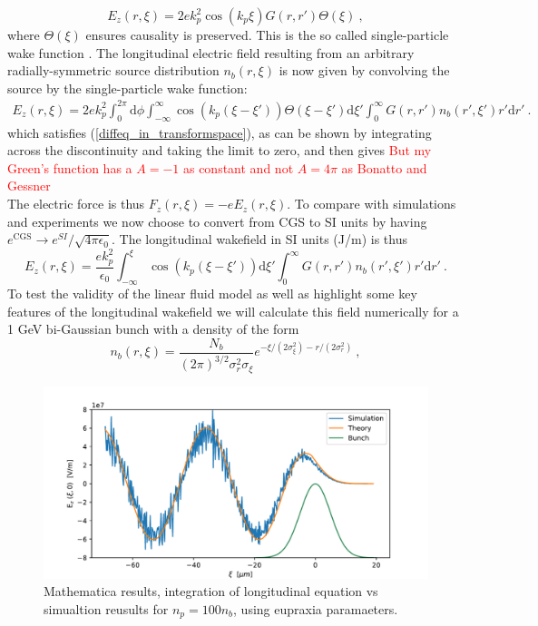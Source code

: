 \documentclass[%
onecolumn, notitlepage,
 amsmath,amssymb,
 aps,
]{article}
\begin{document}
\begin{equation}
E_z(r,\xi)=2ek_p^2\cos(k_p\xi)G\left(r,r'\right)\Theta(\xi)~,
\label{singe-particle-wake}
\end{equation}
where $\Theta(\xi)$ ensures causality is preserved. This is the so called single-particle wake function \cite{Katsouleas1987}. The longitudinal electric field resulting from an arbitrary radially-symmetric source distribution $n_b(r,\xi)$ is now given by convolving the source by the single-particle wake function:
\begin{align}
E_z(r,\xi)=2ek_p^2\int_0^{2\pi}\mathrm{d}\phi  \int_{-\infty}^{\infty} \cos(k_p(\xi-\xi'))\Theta(\xi-\xi')\mathrm{d}\xi' \int_{0}^{\infty}G\left(r,r'\right) n_b(r',\xi')r'\mathrm{d}r'~.
\end{align}
which satisfies (\ref{diffeq_in_transformspace}), as can be shown by integrating across the discontinuity and taking the limit to zero, and then gives
\textcolor{red}{But my Green's function has a $A=-1$ as constant and not $A=4\pi$ as Bonatto and Gessner}\\The electric force is thus $F_z(r,\xi)=-eE_z(r,\xi)$. 
To compare with simulations and experiments we now choose to convert from CGS to SI units by having $e^{\text{CGS}}\to e^{SI}/\sqrt{4\pi\epsilon_0}$. The longitudinal wakefield in SI units (J/m) is thus
\begin{equation}
E_z(r,\xi)=\frac{e k_p^2}{\epsilon_0} \int_{-\infty}^{\xi} \cos(k_p(\xi-\xi'))\mathrm{d}\xi' \int_{0}^{\infty}G\left(r,r'\right) n_b(r',\xi')r'\mathrm{d}r'~.
\label{longitudinalforce}
\end{equation}
To test the validity of the linear fluid model as well as highlight some key features of the longitudinal wakefield we will calculate this field numerically for a 1 GeV bi-Gaussian bunch with a density of the form
\begin{equation}
n_b(r,\xi)=\frac{N_b}{(2\pi)^{3/2}\sigma_r^2\sigma_{\xi}}e^{-\xi/(2\sigma_{\xi}^2)-r/(2\sigma_{r}^2)}~,
\label{bigaussian}
\end{equation}
\begin{figure}
\includegraphics[width=\textwidth]{longitudinal_theory_vs_simulation}
\caption{Mathematica results, integration of longitudinal equation vs simualtion reusults for $n_p=100n_b$, using eupraxia paramaeters. }
\end{figure}
\end{document}
